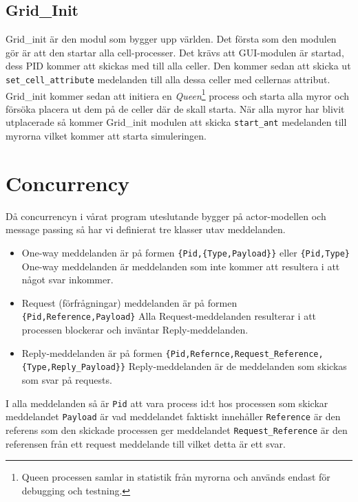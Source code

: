 \subsection{Grid\_Init}

Grid\_init är den modul som bygger upp världen. Det första som den modulen gör är att den startar alla cell-processer. Det krävs att GUI-modulen är startad, dess PID kommer att skickas med till alla celler. Den kommer sedan att skicka ut \verb+set_cell_attribute+ medelanden till alla dessa celler med cellernas attribut. Grid\_init kommer sedan att initiera en \emph{Queen}\footnote{Queen processen samlar in statistik från myrorna och används endast för debugging och testning.} process och starta alla myror och försöka placera ut dem på de celler där de skall starta. När alla myror har blivit utplacerade så kommer Grid\_init modulen att skicka \verb+start_ant+ medelanden till myrorna vilket kommer att starta simuleringen.

\section{Concurrency}

Då concurrencyn i vårat program uteslutande bygger på actor-modellen och message passing så har vi definierat tre klasser utav meddelanden.

\begin{itemize}

\item One-way meddelanden är på formen \verb+{Pid,{Type,Payload}}+ eller \verb+{Pid,Type}+
	One-way meddelanden är meddelanden som inte kommer att resultera i att något svar inkommer.

\item	Request (förfrågningar) meddelanden är på formen \verb+{Pid,Reference,Payload}+
	Alla Request-meddelanden resulterar i att processen blockerar och inväntar Reply-meddelanden.

\item	Reply-meddelanden är på formen \verb+{Pid,Refernce,Request_Reference,{Type,Reply_Payload}}+
	Reply-meddelanden är de meddelanden som skickas som svar på requests.

\end{itemize}


I alla meddelanden så är \verb+Pid+ att vara process id:t hos processen som skickar meddelandet \verb+Payload+ är vad meddelandet faktiskt innehåller  \verb+Reference+ är den referens som den skickade processen ger meddelandet \verb+Request_Reference+ är den referensen från ett request meddelande till vilket detta är ett svar.

